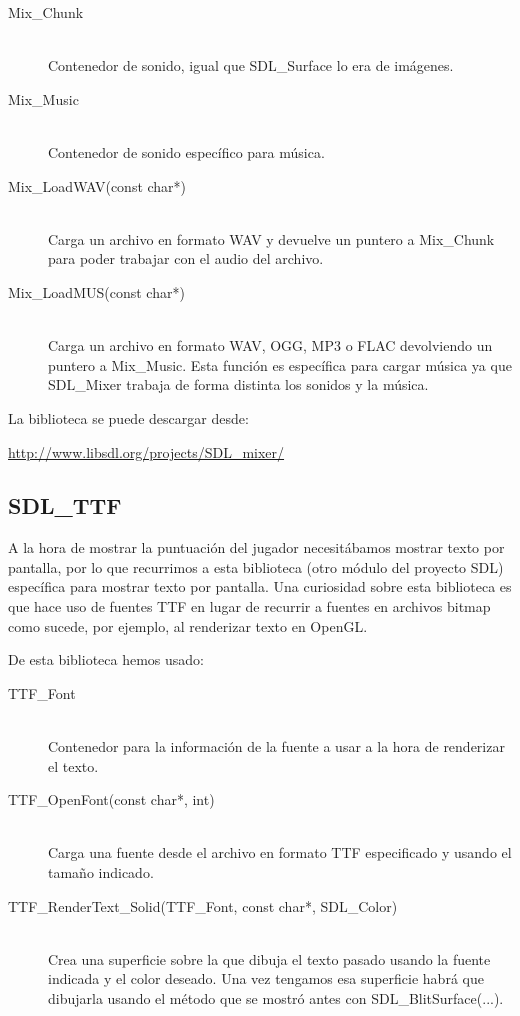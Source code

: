 \documentclass[parskip=half*]{scrartcl}
\begin{document}
	\begin{description}
		\item[Mix\_Chunk] \hfill \\	Contenedor de sonido, igual que SDL\_Surface lo era de im\'agenes.

		\item[Mix\_Music] \hfill \\ Contenedor de sonido espec\'ifico para m\'usica.

		\item[Mix\_LoadWAV(const char*)] \hfill \\	Carga un archivo en formato WAV y devuelve un puntero a Mix\_Chunk para poder trabajar con el audio del archivo.

		\item[Mix\_LoadMUS(const char*)] \hfill \\	Carga un archivo en formato WAV, OGG, MP3 o FLAC devolviendo un puntero a Mix\_Music. Esta funci\'on es espec\'ifica para cargar m\'usica ya que SDL\_Mixer trabaja de forma distinta los sonidos y la m\'usica.
	\end{description}

	La biblioteca se puede descargar desde: \\

	\centerline{\url{http://www.libsdl.org/projects/SDL_mixer/}}

	\subsection{SDL\_TTF}
	A la hora de mostrar la puntuaci\'on del jugador necesit\'abamos mostrar texto por pantalla, por lo que recurrimos a esta biblioteca (otro m\'odulo del proyecto SDL) espec\'ifica para mostrar texto por pantalla. Una curiosidad sobre esta biblioteca es que hace uso de fuentes TTF en lugar de recurrir a fuentes en archivos bitmap como sucede, por ejemplo, al renderizar texto en OpenGL.

	De esta biblioteca hemos usado:

	\begin{description}
		\item[TTF\_Font] \hfill \\	Contenedor para la informaci\'on de la fuente a usar a la hora de renderizar el texto.

		\item[TTF\_OpenFont(const char*, int)] \hfill \\ Carga una fuente desde el archivo en formato TTF especificado y usando el tamaño indicado.

		\item[TTF\_RenderText\_Solid(TTF\_Font, const char*, SDL\_Color)] \hfill \\ Crea una superficie sobre la que dibuja el texto pasado usando la fuente indicada y el color deseado. Una vez tengamos esa superficie habr\'a que dibujarla usando el m\'etodo que se mostr\'o antes con SDL\_BlitSurface(...). 
	\end{description}
\end{document}
